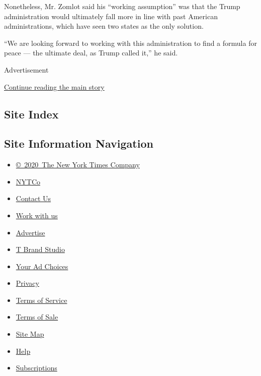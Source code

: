 Nonetheless, Mr. Zomlot said his ``working assumption'' was that the
Trump administration would ultimately fall more in line with past
American administrations, which have seen two states as the only
solution.

``We are looking forward to working with this administration to find a
formula for peace --- the ultimate deal, as Trump called it,'' he said.

Advertisement

\protect\hyperlink{after-bottom}{Continue reading the main story}

\hypertarget{site-index}{%
\subsection{Site Index}\label{site-index}}

\hypertarget{site-information-navigation}{%
\subsection{Site Information
Navigation}\label{site-information-navigation}}

\begin{itemize}
\tightlist
\item
  \href{https://help.nytimes.com/hc/en-us/articles/115014792127-Copyright-notice}{©~2020~The
  New York Times Company}
\end{itemize}

\begin{itemize}
\tightlist
\item
  \href{https://www.nytco.com/}{NYTCo}
\item
  \href{https://help.nytimes.com/hc/en-us/articles/115015385887-Contact-Us}{Contact
  Us}
\item
  \href{https://www.nytco.com/careers/}{Work with us}
\item
  \href{https://nytmediakit.com/}{Advertise}
\item
  \href{http://www.tbrandstudio.com/}{T Brand Studio}
\item
  \href{https://www.nytimes.com/privacy/cookie-policy\#how-do-i-manage-trackers}{Your
  Ad Choices}
\item
  \href{https://www.nytimes.com/privacy}{Privacy}
\item
  \href{https://help.nytimes.com/hc/en-us/articles/115014893428-Terms-of-service}{Terms
  of Service}
\item
  \href{https://help.nytimes.com/hc/en-us/articles/115014893968-Terms-of-sale}{Terms
  of Sale}
\item
  \href{https://spiderbites.nytimes.com}{Site Map}
\item
  \href{https://help.nytimes.com/hc/en-us}{Help}
\item
  \href{https://www.nytimes.com/subscription?campaignId=37WXW}{Subscriptions}
\end{itemize}
